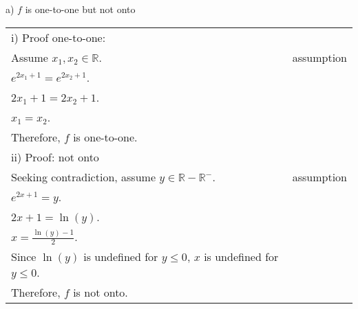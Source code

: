 \documentclass[12pt]{exam}
\begin{document}
\begin{solution}
	a) $f$ is one-to-one but not onto\\
	\begin{tabular}{l l}
		i) Proof one-to-one:                                                      \\
		Assume $x_1,x_2\in\mathbb{R}$.                               & assumption \\
		$e^{2x_1+1}=e^{2x_2+1}$.                                     &            \\
		$2x_1+1=2x_2+1$.                                             &            \\
		$x_1=x_2$.                                                   &            \\
		Therefore, $f$ is one-to-one.                                &            \\
		ii) Proof: not onto                                                       \\
		Seeking contradiction, assume $y\in\mathbb{R}-\mathbb{R}^-$. & assumption \\
		$e^{2x+1}=y$.                                                &            \\
		$2x+1=\ln(y)$.                                               &            \\
		$x=\frac{\ln(y)-1}{2}$.                                      &            \\
		Since $\ln(y)$ is undefined for $y\le 0$, $x$ is undefined for $y\le 0$.  \\
		Therefore, $f$ is not onto.                                  &            \\
	\end{tabular}\\


\end{solution}
\end{document}
